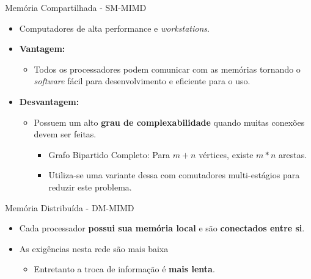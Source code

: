 \begin{frame}{Memória Compartilhada - SM-MIMD}
	\begin{itemize}

		\item Computadores de alta performance e \textit{workstations}.

						\bigskip
		\item \textbf{Vantagem:}
		\begin{itemize}
		    \item Todos os processadores podem comunicar com as memórias tornando o \textit{software} fácil para desenvolvimento e eficiente para o uso.
		\end{itemize}

			\bigskip

		\item \textbf{Desvantagem:}
		\begin{itemize}
			\item Possuem um alto \textbf{grau de complexabilidade} quando muitas conexões devem ser feitas.
			\begin{itemize}
			    \item Grafo Bipartido Completo: Para $m + n$ vértices, existe $m*n$ arestas.
			    \item Utiliza-se uma variante dessa com comutadores multi-estágios para reduzir este problema.
			\end{itemize}
		\end{itemize}

	\end{itemize}

\end{frame}








\begin{frame}{Memória Distribuída - DM-MIMD}
	\begin{itemize}
			\item Cada processador \textbf{possui sua memória local} e são \textbf{conectados entre si}.
			\item As exigências nesta rede são mais baixa
			\begin{itemize}
			    \item Entretanto a troca de informação é \textbf{mais lenta}.
			\end{itemize}

	\end{itemize}

\end{frame}


